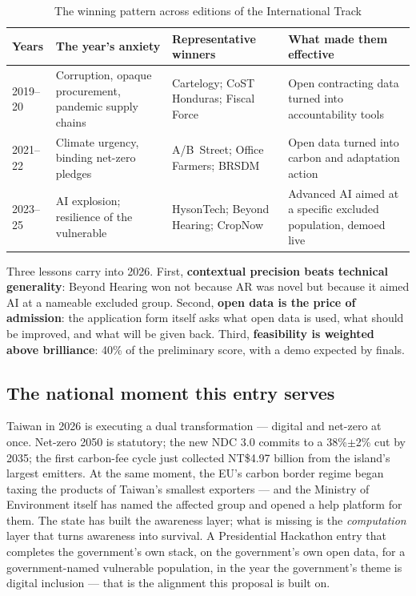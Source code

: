 \begin{table}[htbp]
\caption{The winning pattern across editions of the International Track}
\label{tab:winners}
\small
\begin{tabularx}{\textwidth}{@{}p{}p{}p{}X@{}}
\toprule
\textbf{Years} & \textbf{The year's anxiety} & \textbf{Representative winners} & \textbf{What made them effective} \\
\midrule
2019--20 & Corruption, opaque procurement, pandemic supply chains & Cartelogy; CoST Honduras; Fiscal Force & Open contracting data turned into accountability tools \\
2021--22 & Climate urgency, binding net-zero pledges & A/B~Street; Office Farmers; BRSDM & Open data turned into carbon and adaptation action \\
2023--25 & AI explosion; resilience of the vulnerable & HysonTech; Beyond Hearing; CropNow & Advanced AI aimed at a specific excluded population, demoed live \\
\bottomrule
\end{tabularx}
\end{table}

Three lessons carry into 2026. First, \textbf{contextual precision beats
technical generality}: Beyond Hearing won not because AR was novel but because
it aimed AI at a nameable excluded group. Second, \textbf{open data is the
price of admission}: the application form itself asks what open data is used,
what should be improved, and what will be given back\cite{handbook}. Third,
\textbf{feasibility is weighted above brilliance}: 40\% of the preliminary
score, with a demo expected by finals\cite{handbook}.

\subsection{The national moment this entry serves}

Taiwan in 2026 is executing a dual transformation --- digital and net-zero at
once. Net-zero 2050 is statutory; the new NDC 3.0 commits to a 38\%$\pm$2\% cut
by 2035\cite{ndc}; the first carbon-fee cycle just collected NT\$4.97 billion
from the island's largest emitters\cite{focus}. At the same moment, the EU's
carbon border regime began taxing the products of Taiwan's smallest exporters
--- and the Ministry of Environment itself has named the affected group and
opened a help platform for them\cite{tpt-cbam}. The state has built the
awareness layer; what is missing is the \emph{computation} layer that turns
awareness into survival. A Presidential Hackathon entry that completes the
government's own stack, on the government's own open data, for a
government-named vulnerable population, in the year the government's theme is
digital inclusion --- that is the alignment this proposal is built on.
